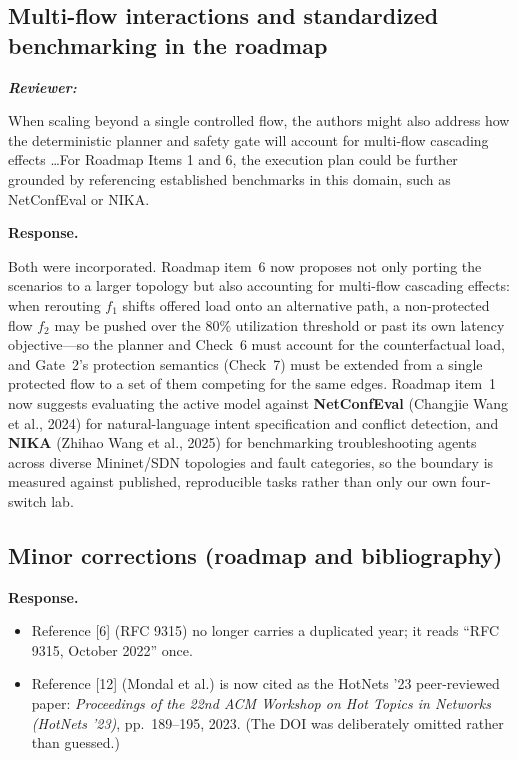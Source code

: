 \documentclass[11pt,a4paper]{article}
\newenvironment{reviewer}{\par\medskip\noindent\begin{minipage}{\linewidth}\small\itshape\color{quote}\textbf{Reviewer:}\par}{\end{minipage}\medskip\par}
\newenvironment{response}{\par\noindent\begin{minipage}{\linewidth}\small\textbf{Response.}\par}{\end{minipage}\medskip\par}
\begin{document}
\subsection{Multi-flow interactions and standardized benchmarking in the
roadmap}

\begin{reviewer}
When scaling beyond a single controlled flow, the authors might also
address how the deterministic planner and safety gate will account for
multi-flow cascading effects \ldots For Roadmap Items 1 and 6, the
execution plan could be further grounded by referencing established
benchmarks in this domain, such as NetConfEval or NIKA.
\end{reviewer}

\begin{response}
Both were incorporated. Roadmap item~6 now proposes not only porting the
scenarios to a larger topology but also accounting for multi-flow cascading
effects: when rerouting $f_1$ shifts offered load onto an alternative
path, a non-protected flow $f_2$ may be pushed over the $80\%$ utilization
threshold or past its own latency objective---so the planner and Check~6
must account for the counterfactual load, and Gate~2's protection semantics
(Check~7) must be extended from a single protected flow to a set of them
competing for the same edges. Roadmap item~1 now suggests evaluating the
active model against \textbf{NetConfEval} (Changjie Wang et al., 2024) for
natural-language intent specification and conflict detection, and
\textbf{NIKA} (Zhihao Wang et al., 2025) for benchmarking troubleshooting
agents across diverse Mininet/SDN topologies and fault categories, so the
boundary is measured against published, reproducible tasks rather than only
our own four-switch lab.
\end{response}

\subsection{Minor corrections (roadmap and bibliography)}

\begin{response}
\begin{itemize}
  \item Reference [6] (RFC 9315) no longer carries a duplicated year; it
    reads ``RFC 9315, October 2022'' once.
  \item Reference [12] (Mondal et al.) is now cited as the HotNets '23
    peer-reviewed paper: \emph{Proceedings of the 22nd ACM Workshop on Hot
    Topics in Networks (HotNets '23)}, pp.\ 189--195, 2023. (The DOI was
    deliberately omitted rather than guessed.)
\end{itemize}
\end{response}
\end{document}
